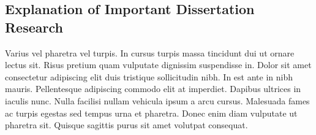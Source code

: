\subsection{Explanation of Important Dissertation Research}

Varius vel pharetra vel turpis. In cursus turpis massa tincidunt dui ut ornare lectus sit. Risus pretium quam vulputate dignissim suspendisse in. Dolor sit amet consectetur adipiscing elit duis tristique sollicitudin nibh. In est ante in nibh mauris. Pellentesque adipiscing commodo elit at imperdiet. Dapibus ultrices in iaculis nunc. Nulla facilisi nullam vehicula ipsum a arcu cursus. Malesuada fames ac turpis egestas sed tempus urna et pharetra. Donec enim diam vulputate ut pharetra sit. Quisque sagittis purus sit amet volutpat consequat.






